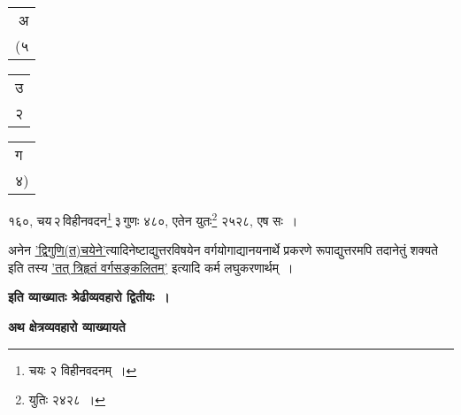 \documentclass[10pt, openany]{book}
\begin{document}
{{{{{{{{{{{{{{{{{\newpage

\vspace{-1mm}

\begin{center}
\begin{tabular}{r} अ\\(५\\\end{tabular}
\begin{tabular}{r}उ \\२\\ \end{tabular}
\begin{tabular}{l}ग\\ ४)\\ \end{tabular}
\end{center}
\vspace{-1mm}
 
{१६०, चय\textendash \,२\textendash \,विहीनवदन\renewcommand{\thefootnote}{४}\footnote{चयः २ विहीनवदनम्~।}\textendash \,३\textendash \,गुणः ४८०, एतेन युतः\renewcommand{\thefootnote}{५}\footnote{युतिः
२४२८~।} २५२८, एष सः~।}
\vspace{3mm}

{अनेन \hyperref[105]{'द्विगुणि(त)चयेने'}त्यादिनेष्टाद्युत्तरविषयेन वर्गयोगाद्यानयनार्थे प्रकरणे रूपाद्युत्तरमपि तदानेतुं शक्यते इति तस्य \hyperref[102]{'तत् त्रिहृतं वर्गसङ्कलितम्'} इत्यादि कर्म लघुकरणार्थम्~।}
\vspace{3mm}

\begin{center}
\textbf{इति व्याख्यातः श्रेढीव्यवहारो द्वितीयः~।} \end{center}

\afterpage{\fancyhead[CO] {\s}}
\afterpage{\fancyhead[CE] {\s}}

\newpage

 \label{kshe}
\begin{center}
\textbf{\large अथ क्षेत्रव्यवहारो व्याख्यायते}\end{center}
\vspace{2mm}

}}}}}}}}}}}}}}}}}
\end{document}
